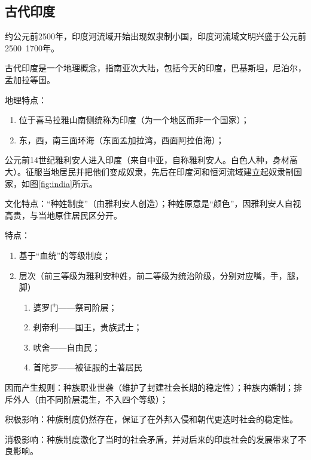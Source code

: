 \subsection{古代印度}

约公元前2500年，印度河流域开始出现奴隶制小国，印度河流域文明兴盛于公元前2500~1700年。

古代印度是一个地理概念，指南亚次大陆，包括今天的印度，巴基斯坦，尼泊尔，孟加拉等国。

地理特点：

\begin{enumerate}
    \item 位于喜马拉雅山南侧统称为印度（为一个地区而非一个国家）；
    \item 东，西，南三面环海（东面孟加拉湾，西面阿拉伯海）；
\end{enumerate}

公元前14世纪雅利安人进入印度（来自中亚，自称雅利安人。白色人种，身材高大）。征服当地居民并把他们变成奴隶，先后在印度河和恒河流域建立起奴隶制国家，如图\ref{fig:india}所示。

文化特点：“种姓制度”（由雅利安人创造）；种姓原意是“颜色”，因雅利安人自视高贵，与当地原住居民区分开。

特点：

\begin{enumerate}
    \item 基于“血统”的等级制度；
    \item 层次（前三等级为雅利安种姓，前二等级为统治阶级，分别对应嘴，手，腿，脚）
    \begin{enumerate}
        \item 婆罗门——祭司阶层；
        \item 刹帝利——国王，贵族武士；
        \item 吠舍——自由民；
        \item 首陀罗——被征服的土著居民
    \end{enumerate}
\end{enumerate}

因而产生规则：种族职业世袭（维护了封建社会长期的稳定性）；种族内婚制；排斥外人（由不同阶层混生，不入四个等级）；

积极影响：种族制度仍然存在，保证了在外邦入侵和朝代更迭时社会的稳定性。

消极影响：种族制度激化了当时的社会矛盾，并对后来的印度社会的发展带来了不良影响。


